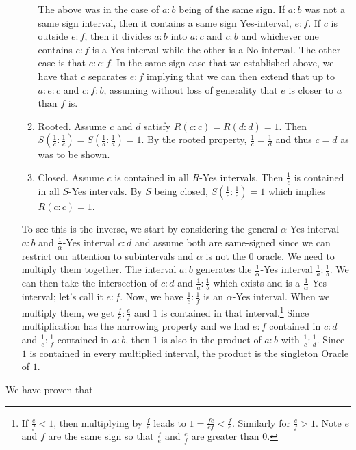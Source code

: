 \documentclass[12pt]{article}
\theoremstyle{remark}
\begin{document}
\begin{itemize}
\begin{enumerate}
        The above was in the case of $a:b$ being of the same sign. If $a:b$ was not a same sign interval, then it contains a same sign Yes-interval, $e:f$. If $c$ is outside $e:f$, then it divides $a:b$ into $a:c$ and $c:b$ and whichever one contains $e:f$ is a Yes interval while the other is a No interval. The other case is that $e:c:f$. In the same-sign case that we established above, we have that $c$ separates $e:f$ implying that we can then extend that up to $a:e:c$ and $c:f:b$, assuming without loss of generality that $e$ is closer to $a$ than $f$ is. 
        \item Rooted. Assume $c$ and $d$ satisfy $R(c:c)=R(d:d)=1$. Then $S(\frac{1}{c}:\frac{1}{c})=S(\frac{1}{d}:\frac{1}{d})=1$. By the rooted property, $\frac{1}{c} = \frac{1}{d}$ and thus $c=d$ as was to be shown. 
        \item Closed. Assume $c$ is contained in all $R$-Yes intervals. Then $\frac{1}{c}$ is contained in all $S$-Yes intervals. By $S$ being closed, $S(\frac{1}{c}:\frac{1}{c})=1$ which implies $R(c:c)=1$.
    \end{enumerate}
    
    To see this is the inverse, we start by considering the general $\alpha$-Yes interval $a:b$ and $\frac{1}{\alpha}$-Yes interval $c:d$ and assume both are same-signed since we can restrict our attention to subintervals and $\alpha$ is not the 0 oracle. We need to multiply them together. The interval $a:b$ generates the $\frac{1}{\alpha}$-Yes interval $\frac{1}{a}:\frac{1}{b}$. We can then take the intersection of $c:d$ and $\frac{1}{a}:\frac{1}{b}$ which exists and is a $\frac{1}{\alpha}$-Yes interval; let's call it $e:f$. Now, we have $\frac{1}{e}:\frac{1}{f}$ is an $\alpha$-Yes interval. When we multiply them, we get $\frac{f}{e}:\frac{e}{f}$ and $1$ is  contained in that interval.\footnote{If $\frac{e}{f} <1$, then multiplying by $\frac{f}{e}$ leads to $1 = \frac{fe}{ef} < \frac{f}{e}$. Similarly for $\frac{e}{f} > 1$. Note $e$ and $f$ are the same sign so that $\frac{f}{e}$ and $\frac{e}{f}$ are greater than 0. } Since multiplication has the narrowing property and we had $e:f$ contained in $c:d$ and $\frac{1}{e}:\frac{1}{f}$ contained in $a:b$, then $1$ is also in the product of $a:b$ with $\frac{1}{c}:\frac{1}{d}$. Since $1$ is contained in every multiplied interval, the product is the singleton Oracle of $1$. 
    
\end{itemize}

We have proven that
\end{document}
